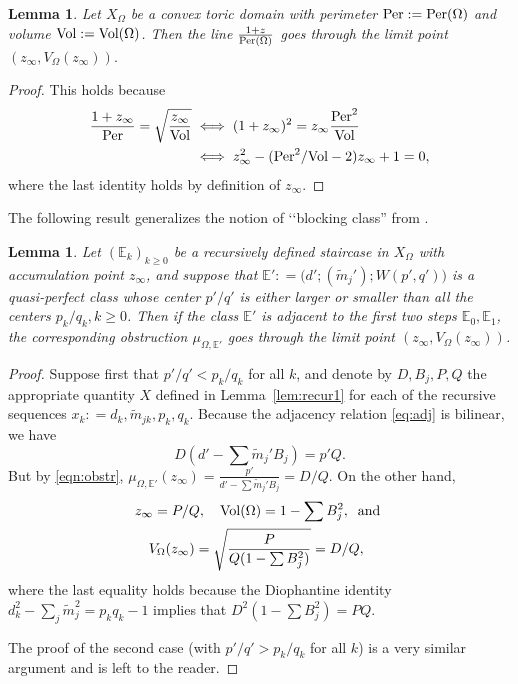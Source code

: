 \documentclass[11pt, reqno]{amsart}
\newtheorem{lemma}[thm]{Lemma}
\theoremstyle{remark}
\numberwithin{equation}{subsection}
\numberwithin{figure}{section}
\theoremstyle{customremark}
\newcommand{\Vol}{{\rm Vol}}
\newcommand{\Per}{{\rm Per}}
\newcommand{\Tm}{{\widetilde m}}
\newcommand{\bE}{{\mathbb E}}
\newcommand{\Om}{{\Omega}}
\begin{document}
\begin{lemma} \label{lem:perLine} Let $X_\Omega$ be a
 convex toric domain with perimeter $\Per: = \Per(\Om)$ and volume $\Vol: = \Vol(\Om)$. Then
 the line $\frac{1+z}{\Per(\Om)}$ goes through the limit  point $(z_\infty,V_{\Omega}(z_\infty)).$
\end{lemma}
\begin{proof} This holds because
    \begin{align*}\frac{1+z_\infty}{\Per}=\sqrt{\frac{z_\infty}{\Vol}} 
    &\iff (1+z_\infty)^2 =z_\infty\frac{\Per^2}{\Vol} \\
    & \iff z_\infty^2-(\Per^2/\Vol-2)z_\infty+1 =0,
    \end{align*}
where   the last identity  holds by definition of $z_\infty$.
\end{proof}

The following result generalizes the notion of \lq\lq blocking class'' from \cite{MM,MMW}.

\begin{lemma}\label{lem:adjblock}  Let $(\bE_k)_{k\ge 0}$ be a recursively defined staircase in $X_\Om$ with accumulation point $z_\infty$, and suppose
that $\bE': = \bigl(d'; (\Tm_j'); W(p',q')\bigr)$ is a quasi-perfect class whose center $p'/q'$  is either larger or smaller than all the centers $p_k/q_k, k\ge 0$.  Then if the class $\bE'$ is adjacent to the first two steps $\bE_0, \bE_1$, the corresponding obstruction $\mu_{\Om,\bE'}$ goes through the limit point $(z_\infty, V_\Om(z_\infty))$.
\end{lemma}

\begin{proof} Suppose first that $p'/q' < p_k/q_k$ for all $k$, and denote by $D, B_j,P, Q$ the appropriate quantity $X$ defined in
Lemma~\ref{lem:recur1}  for each of the recursive sequences $x_k: = d_k,\widetilde{m}_{jk},p_k,q_k $. 
Because the adjacency relation \eqref{eq:adj} is bilinear,  we have
$$
D(d' - \sum \Tm_j'B_j) = p'Q.
$$
But by \eqref{eqn:obstr}, $\mu_{\Om,\bE'}(z_\infty) = \frac {p'}{d' - \sum \Tm_j'B_j} = D/Q$.  On the other hand, 
\begin{align*}
&z_\infty = P/Q,\quad  \Vol(\Om) = 1-\sum B_j^2,\;\;\mbox{and } \\
&\quad 
V_\Om(z_\infty) = \sqrt{\frac P{Q(1-\sum B_j^2)}} = D/Q,
\end{align*}
 where the last equality holds because the   Diophantine identity
$d_k^2 - \sum_j \Tm_j^2 = p_kq_k - 1$ implies that $D^2 (1-\sum B_j^2) = PQ$.

The proof of the  second case (with
 $p'/q' > p_k/q_k$ for all $k$) is a very similar argument  and is left to the reader.
\end{proof}
\end{document}
